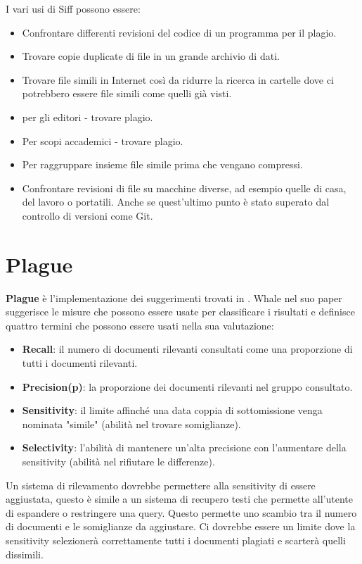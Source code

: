 		I vari usi di Siff possono essere: 
		
		\begin{itemize}
			\item Confrontare differenti revisioni del codice di un programma per il plagio.
			\item Trovare copie duplicate di file in un grande archivio di dati.
			\item Trovare file simili in Internet così da ridurre la ricerca in cartelle dove ci potrebbero essere file simili come quelli già visti.
			\item per gli editori - trovare plagio.
			\item Per scopi accademici - trovare plagio.
			\item Per raggruppare insieme file simile prima che vengano compressi.
			\item Confrontare revisioni di file su macchine diverse, ad esempio quelle di casa, del lavoro o portatili. Anche se quest'ultimo punto è stato superato dal controllo di versioni come Git.
		\end{itemize}
		
		
	\section{Plague}\label{def:Plague}
		\textbf{Plague} è l'implementazione dei suggerimenti trovati in  \citep{Whale1990}.
		Whale nel suo paper suggerisce le misure che possono essere usate per classificare i risultati e definisce quattro termini che possono essere usati nella sua valutazione: 
		\begin{itemize}
			\item\textbf{Recall}: il numero di documenti rilevanti consultati come una proporzione di tutti i documenti rilevanti.
			\item \textbf{Precision(p)}: la proporzione dei documenti rilevanti nel gruppo consultato.
			\item \textbf{Sensitivity}: il limite affinché una data coppia di sottomissione venga nominata "simile" (abilità nel trovare somiglianze).
			\item \textbf{Selectivity}: l'abilità di mantenere un'alta precisione con l'aumentare della sensitivity (abilità nel rifiutare le differenze).
		\end{itemize}
		
		Un sistema di rilevamento dovrebbe permettere alla sensitivity di essere aggiustata, questo è simile a un sistema di recupero testi che permette all'utente di espandere o restringere una query. Questo permette uno scambio tra il numero di documenti e le somiglianze da aggiustare. Ci dovrebbe essere un limite dove la sensitivity selezionerà correttamente tutti i documenti plagiati e scarterà quelli dissimili.
		

